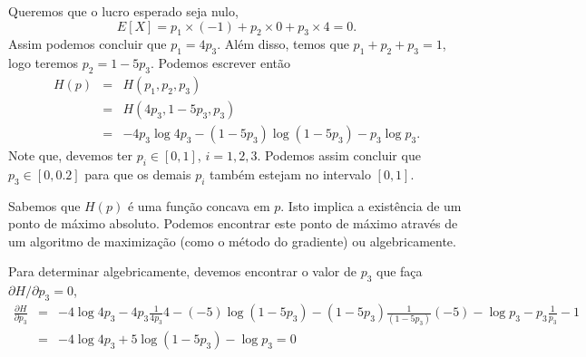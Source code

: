\begin{questions}
\begin{solution}
  Queremos que o lucro esperado seja nulo,
  \begin{equation}
  E [X] = p_1 \times (-1) + p_2 \times 0 + p_3 \times 4 = 0 .
  \end{equation}
  Assim podemos concluir que $p_1 = 4 p_3$.
  Além disso, temos que $p_1 + p_2 + p_3 = 1$, logo teremos $p_2 = 1 - 5p_3$.
  Podemos escrever então
  \begin{eqnarray}
  H(p) &=& H(p_1, p_2, p_3) \\
       &=& H(4p_3, 1-5p_3, p_3) \\
       &=& - 4p_3 \log 4p_3 - (1-5p_3) \log (1-5p_3) - p_3 \log p_3 .
  \end{eqnarray}
  Note que, devemos ter $p_i \in [0, 1]$, $i=1,2,3$. Podemos assim concluir
  que $p_3 \in [0, 0.2]$ para que os demais $p_i$ também estejam no intervalo $[0, 1]$.

  Sabemos que $H(p)$ é uma função concava em $p$.
  Isto implica a existência de um ponto de máximo absoluto.
  Podemos encontrar este ponto de máximo através de um algoritmo de maximização
  (como o método do gradiente) ou algebricamente.

  Para determinar algebricamente, devemos encontrar o valor de $p_3$ que faça
  $\partial H / \partial p_3 = 0$,
  \begin{eqnarray}
  \frac{\partial H}{\partial p_3} &=& - 4 \log 4p_3 - 4p_3 \frac{1}{4p_3} 4 - (-5) \log (1-5p_3) - (1-5p_3) \frac{1}{(1-5p_3)}(-5) - \log p_3 - p_3 \frac{1}{p_3} - 1 \\
          &=& - 4 \log 4p_3 + 5 \log (1-5p_3) - \log p_3 = 0
  \end{eqnarray}


\end{solution}
\end{questions}

